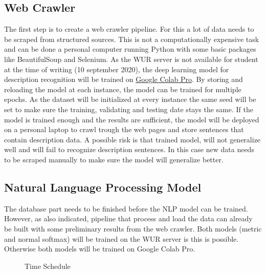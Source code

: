 \documentclass{article}
\begin{document}
\subsection{Web Crawler}
The first step is to create a web crawler pipeline. 
For this a lot of data needs to be scraped from structured sources.
This is not a computationally expensive task and can be done a personal computer running Python with some basic packages like BeautifulSoup and Selenium.
As the WUR server is not available for student at the time of writing (10 september 2020), the deep learning model for description recognition will be trained on \href{https://colab.research.google.com/}{Google Colab Pro}. 
By storing and reloading the model at each instance, the model can be trained for multiple epochs.
As the dataset will be initialized at every instance the same seed will be set to make sure the training, validating and testing date stays the same.
If the model is trained enough and the results are sufficient, the model will be deployed on a personal laptop to crawl trough the web pages and store sentences that contain description data.
A possible risk is that trained model, will not generalize well and will fail to recognize description sentences.
In this case new data needs to be scraped manually to make sure the model will generalize better.
\subsection{Natural Language Processing Model}
The database part needs to be finished before the NLP model can be trained.
However, as also indicated, pipeline that process and load the data can already be built with some preliminary results from the web crawler.
Both models (metric and normal softmax) will be trained on the WUR server is this is possible. 
Otherwise both models will be trained on Google Colab Pro.


\begin{figure} [t]
    \centering
    \vspace{-2.5cm}
    \hspace{-1.3cm}
    \makebox[\textwidth][c]{}
    \caption{Time Schedule}
    \label{fig:time_schedule}
\end{figure}

\newpage
\printbibliography
\end{document}
